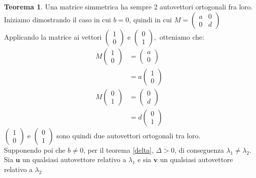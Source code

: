 \documentclass[10pt,a4paper]{article}
\theoremstyle{plain}
\theoremstyle{definition}
\newtheorem{teorema}[subsection]{Teorema}
\begin{document}
\begin{teorema}
	Una matrice simmetrica ha sempre 2 autovettori ortogonali fra loro. 
	\proof
	\[\]
	Iniziamo dimostrando il caso in cui $b=0$, quindi in cui $M=\begin{pmatrix}
	a & 0 \\ 0 & d
	\end{pmatrix}$\\
	Applicando la matrice ai vettori $\begin{pmatrix}
	1 \\ 0 
	\end{pmatrix}$ e $\begin{pmatrix}
	0 \\ 1 
	\end{pmatrix},$ otteniamo che:\\
	\begin{align*}
		M\begin{pmatrix}
			1 \\ 0
		\end{pmatrix}&=\begin{pmatrix}
			a \\ 0
		\end{pmatrix}
		\\
		&=a\begin{pmatrix}
		1 \\ 0
		\end{pmatrix}\\
		M\begin{pmatrix}
		0 \\ 1
		\end{pmatrix}&=\begin{pmatrix}
		0 \\ d
		\end{pmatrix}
		\\
		&=d\begin{pmatrix}
		0 \\ 1
		\end{pmatrix}
	\end{align*}
	$\begin{pmatrix}
		1 \\ 0
	\end{pmatrix}$ e $\begin{pmatrix}
		0 \\ 1
	\end{pmatrix}$ sono quindi due autovettori ortogonali tra loro.\\
	\[\]
Supponendo poi che $b\ne 0$, per il teorema \ref{delta}, $\Delta > 0$, di conseguenza $\lambda_1 \ne \lambda_2$. Sia $\mathbf{u}$ un qualsiasi autovettore relativo a $\lambda_1$ e sia $\mathbf{v}$ un qualsiasi autovettore relativo a $\lambda_2$

\end{teorema}
\end{document}
